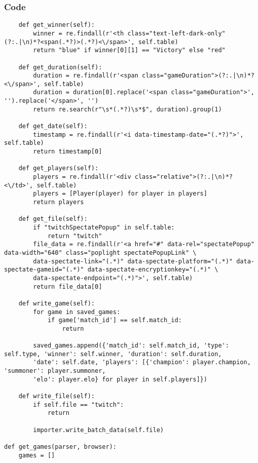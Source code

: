 \documentclass{beamer}
\begin{document}
\begin{frame}[fragile]
    \frametitle{Code}
    \fontsize{3pt}{5pt}\selectfont
    \begin{verbatim}
    def get_winner(self):
        winner = re.findall(r'<th class="text-left-dark-only"(?:.|\n)*?<span(.*?)>(.*?)<\/span>', self.table)
        return "blue" if winner[0][1] == "Victory" else "red"
    
    def get_duration(self):
        duration = re.findall(r'<span class="gameDuration">(?:.|\n)*?<\/span>', self.table)
        duration = duration[0].replace('<span class="gameDuration">', '').replace('</span>', '')
        return re.search(r"\s*(.*?)\s*$", duration).group(1)
    
    def get_date(self):
        timestamp = re.findall(r'<i data-timestamp-date="(.*?)">', self.table)
        return timestamp[0]
    
    def get_players(self):
        players = re.findall(r'<div class="relative">(?:.|\n)*?<\/td>', self.table)
        players = [Player(player) for player in players]
        return players
    
    def get_file(self):
        if "twitchSpectatePopup" in self.table:
            return "twitch"
        file_data = re.findall(r'<a href="#" data-rel="spectatePopup" data-width="640" class="poplight spectatePopupLink" \
        data-spectate-link="(.*)" data-spectate-platform="(.*)" data-spectate-gameid="(.*)" data-spectate-encryptionkey="(.*)" \
        data-spectate-endpoint="(.*)">', self.table)
        return file_data[0]
    
    def write_game(self):
        for game in saved_games:
            if game['match_id'] == self.match_id:
                return
        
        saved_games.append({'match_id': self.match_id, 'type': self.type, 'winner': self.winner, 'duration': self.duration,
        'date': self.date, 'players': [{'champion': player.champion, 'summoner': player.summoner,
        'elo': player.elo} for player in self.players]})

    def write_file(self):
        if self.file == "twitch":
            return
        
        importer.write_batch_data(self.file)

def get_games(parser, browser):
    games = []
    \end{verbatim}
\end{frame}
\end{document}
